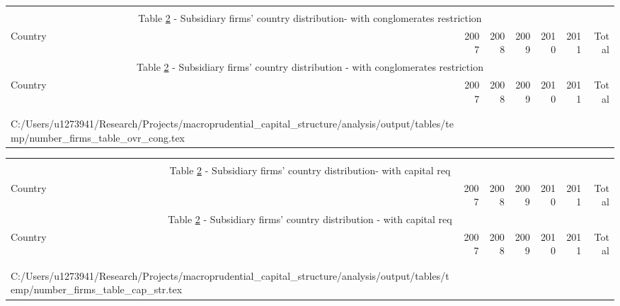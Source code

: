 \documentclass[12pt]{article}
\makeatletter
\newcommand\primitiveinput[1]
{\@@input #1 }
\makeatother
\begin{document}
	\begin{small}
	{
		\begin{longtable}{lrrrrrr}\\
			\label{tab:number of firms}\\
			\multicolumn{7}{c}{Table \ref{tab:number of firms} - Subsidiary firms' country distribution- with conglomerates restriction}\\
			\hline \hline \addlinespace Country & 2007 & 2008 & 2009 & 2010 & 2011 & Total  \\
			\endfirsthead
			\multicolumn{7}{c}{Table \ref{tab:number of firms} - Subsidiary firms' country distribution - with conglomerates restriction}\\
			\hline \hline \addlinespace Country & 2007 & 2008 & 2009 & 2010 & 2011 & Total  \\
			\hline \addlinespace \endhead
			\hline
			\multicolumn{7}{r}{{\textit{(Continued)}}}\\ \endfoot
			\\ 	
			\endlastfoot
			\primitiveinput{C:/Users/u1273941/Research/Projects/macroprudential_capital_structure/analysis/output/tables/temp/number_firms_table_ovr_cong.tex}
			\hline 			
		\end{longtable}	
	}
\end{small}

	\begin{small}
	{
		\begin{longtable}{lrrrrrr}\\
			\label{tab:number of firms}\\
			\multicolumn{7}{c}{Table \ref{tab:number of firms} - Subsidiary firms' country distribution- with capital req}\\
			\hline \hline \addlinespace Country & 2007 & 2008 & 2009 & 2010 & 2011 & Total  \\
			\endfirsthead
			\multicolumn{7}{c}{Table \ref{tab:number of firms} - Subsidiary firms' country distribution - with capital req}\\
			\hline \hline \addlinespace Country & 2007 & 2008 & 2009 & 2010 & 2011 & Total  \\
			\hline \addlinespace \endhead
			\hline
			\multicolumn{7}{r}{{\textit{(Continued)}}}\\ \endfoot
			\\ 	
			\endlastfoot
			\primitiveinput{C:/Users/u1273941/Research/Projects/macroprudential_capital_structure/analysis/output/tables/temp/number_firms_table_cap_str.tex}
			\hline 			
		\end{longtable}	
	}
\end{small}
\end{document}

